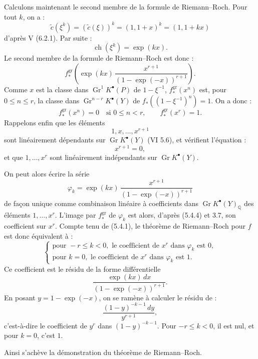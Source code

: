 \documentclass[11pt]{article}
\newcommand{\Gr}{\operatorname{Gr}}
\newcommand{\ch}{\operatorname{ch}}
\providecommand{\ch}{\operatorname{ch}}
\providecommand{\Gr}{\operatorname{Gr}}
\providecommand{\Gr}{\operatorname{G}}
\begin{document}
Calculons maintenant le second membre de la formule de Riemann--Roch. Pour tout \(k\), on a :
\[
 \widetilde c(\xi^k)=(\widetilde c(\xi))^k=(1,1+x)^k=(1,1+kx)
\]
d'après V (6.2.1). Par suite :
\begin{equation}\tag{5.4.2}
 \ch(\xi^k)=\exp(kx).
\end{equation}
Le second membre de la formule de Riemann--Roch est donc :
\begin{equation}\tag{5.4.3}
 f^{\mathrm{gr}}_*\left(\exp(kx)\,
 \frac{x^{r+1}}{(1-\exp(-x))^{r+1}}\right).
\end{equation}
Comme \(x\) est la classe dans \(\Gr^1K^{\bullet}(P)\) de \(1-\xi^{-1}\), \(f^{\mathrm{gr}}_*(x^n)\) est, pour \(0\leq n\leq r\), la classe dans
\(\Gr^{n-r}K^{\bullet}(Y)\) de \(f_*((1-\xi^{-1})^n)=1\). On a donc :
\begin{equation}\tag{5.4.4}
 f^{\mathrm{gr}}_*(x^n)=0\quad\text{si }0\leq n<r,\qquad
 f^{\mathrm{gr}}_*(x^r)=1.
\end{equation}
Rappelons enfin que les éléments
\[
1,x,\ldots,x^{r+1}
\]
sont linéairement dépendants sur \(\Gr K^{\bullet}(Y)\) (VI 5.6), et vérifient l'équation :
\begin{equation}\tag{5.4.5}
 x^{r+1}=0,
\end{equation}
et que \(1,\ldots,x^r\) sont linéairement indépendants sur \(\Gr K^{\bullet}(Y)\).

On peut alors écrire la série
\[
\varphi_k=\exp(kx)\,
\frac{x^{r+1}}{(1-\exp(-x))^{r+1}}
\]
de façon unique comme combinaison linéaire à coefficients dans
\(\Gr K^{\bullet}(Y)_{\mathbb Q}\) des éléments \(1,\ldots,x^r\). L'image par \(f^{\mathrm{gr}}_*\) de \(\varphi_k\) est alors, d'après (5.4.4) et 3.7, son coefficient sur \(x^r\). Compte tenu de (5.4.1), le théorème de Riemann--Roch pour \(f\) est donc équivalent à :
\[
\left\{
\begin{array}{ll}
\text{pour }-r\leq k<0,\text{ le coefficient de }x^r\text{ dans }\varphi_k\text{ est }0,\\
\text{pour }k=0,\text{ le coefficient de }x^r\text{ dans }\varphi_k\text{ est }1.
\end{array}
\right.
\tag{RR}
\]
Ce coefficient est le résidu de la forme différentielle
\[
 \frac{\exp(kx)\,dx}{(1-\exp(-x))^{r+1}}.
\]
En posant \(y=1-\exp(-x)\), on se ramène à calculer le résidu de :
\[
 \frac{(1-y)^{-k-1}\,dy}{y^{r+1}},
\]
c'est-à-dire le coefficient de \(y^r\) dans \((1-y)^{-k-1}\). Pour \(-r\leq k<0\), il est nul, et pour \(k=0\), c'est \(1\).

Ainsi s'achève la démonstration du théorème de Riemann--Roch.
\end{document}
